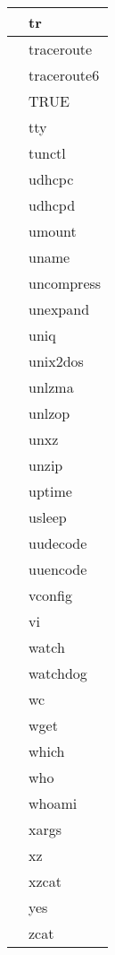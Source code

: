 \begin{longtable}{p{100mm}p{100mm}}
      & tr \\
     \hline
      & traceroute \\
     \hline
      & traceroute6 \\
     \hline
      & TRUE \\
     \hline
      & tty \\
     \hline
      & tunctl \\
     \hline
      & udhcpc \\
     \hline
      & udhcpd \\
     \hline
      & umount \\
     \hline
      & uname \\
     \hline
      & uncompress \\
     \hline
      & unexpand \\
     \hline
      & uniq \\
     \hline
      & unix2dos \\
     \hline
      & unlzma \\
     \hline
      & unlzop \\
     \hline
      & unxz \\
     \hline
      & unzip \\
     \hline
      & uptime \\
     \hline
      & usleep \\
     \hline
      & uudecode \\
     \hline
      & uuencode \\
     \hline
      & vconfig \\
     \hline
      & vi \\
     \hline
      & watch \\
     \hline
      & watchdog \\
     \hline
      & wc \\
     \hline
      & wget \\
     \hline
      & which \\
     \hline
      & who \\
     \hline
      & whoami \\
     \hline
      & xargs \\
     \hline
      & xz \\
     \hline
      & xzcat \\
     \hline
      & yes \\
     \hline
      & zcat \\
     \hline
\end{longtable}

